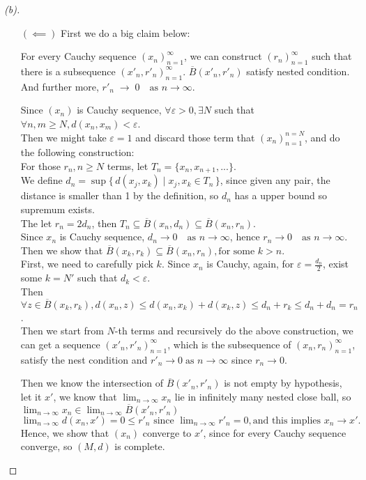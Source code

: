 \begin{proof}[(b)]
\begin{itemize}
        \item [\((\impliedby )\)] First we do a big claim below:
        \begin{claim}
            For every Cauchy sequence $(x_n)_{n=1}^\infty$, we can construct $(r_n)_{n=1}^\infty$ such that there is a subsequence $(x'_n, r'_n)_{n=1}^\infty$.
            $\overline{B}(x'_n,r'_n)$ satisfy nested condition. And further more, $r'_n \;\to\; 0 \quad\text{as } n\to\infty$.
        \end{claim}
        \begin{explanation}
            Since $(x_n)$ is Cauchy sequence, $\forall \varepsilon > 0, \exists N$ such that $\forall n, m \geq N, d(x_n,x_m) < \varepsilon$. \\
            Then we might take $\varepsilon = 1$ and discard those term that $(x_n)_{n=1}^{n=N}$, and do the following construction:\\
            For those $r_n, n \geq N$ terms, let $T_n = \{x_n, x_{n+1}, ...\}$. \\
            We define $d_n = \sup \{\, d(x_j,x_k) \mid x_j,x_k \in T_n \,\}$, since given any pair, the distance is smaller than 1 by the definition, so $d_n$ has a upper bound so supremum exists. \\
            The let $r_n = 2d_n$, then $T_n \subseteq \overline{B}(x_n,d_n) \subseteq \overline{B}(x_n,r_n)$. \\
            Since $x_n$ is Cauchy sequence, $d_n \to 0 \quad\text{as } n\to\infty$, hence $r_n \to 0 \quad\text{as } n\to\infty$.
            Then we show that $\overline{B}(x_k,r_k) \subseteq \overline{B}(x_n,r_n) , \text{for some } k > n$. \\
            First, we need to carefully pick $k$. Since $x_n$ is Cauchy, again, for $\varepsilon = \frac{d_n}{2}$, exist some $k = N'$ such that $d_k < \varepsilon$. \\
            Then $\forall z \in \overline{B}(x_k,r_k), d(x_n, z) \leq d(x_n, x_k) + d(x_k, z) \leq d_n + r_k \leq d_n + d_n = r_n$. \\
            Then we start from $N$-th terms and recursively do the above construction, we can get a sequence $(x'_n, r'_n)_{n=1}^\infty$, which is the subsequence of $(x_n, r_n)_{n=1}^\infty$, satisfy the nest condition and $r'_n \to 0 \;\text{as } n\to\infty$ since $r_n \to 0$.
        \end{explanation}
        Then we know the intersection of $\overline{B}(x'_n,r'_n)$ is not empty by hypothesis, let it $x'$, we know that $\lim_{n \to \infty} x_n$ lie in infinitely many nested close ball, so $\lim_{n \to \infty} x_n \in \lim_{n \to \infty} \overline{B}(x'_n,r'_n)$ $\lim_{n \to \infty} d(x_n, x') = 0 \leq r'_n \text{ since } \lim_{n \to \infty} r'_n = 0,\text{and this implies } x_n \to x'.$
        Hence, we show that $(x_n)$ converge to $x'$, since for every Cauchy sequence converge, so $(M,d)$ is complete.
        
    \end{itemize}
\end{proof}